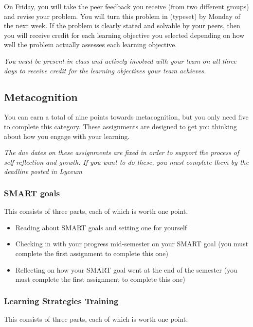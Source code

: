 \documentclass[
  letterpaper,
  DIV=11,
  numbers=noendperiod]{scrartcl}
\providecommand{\tightlist}{%
  \setlength{\itemsep}{0pt}\setlength{\parskip}{0pt}}
\begin{document}
On Friday, you will take the peer feedback you receive (from two
different groups) and revise your problem. You will turn this problem in
(typeset) by Monday of the next week. If the problem is clearly stated
and solvable by your peers, then you will receive credit for each
learning objective you selected depending on how well the problem
actually assesses each learning objective.

\emph{You must be present in class and actively involved with your team
on all three days to receive credit for the learning objectives your
team achieves.}

\subsection{Metacognition}\label{metacognitiongrade}

You can earn a total of nine points towards metacognition, but you only
need five to complete this category. These assignments are designed to
get you thinking about how you engage with your learning.

\emph{The due dates on these assignments are fixed in order to support
the process of self-reflection and growth. If you want to do these, you
must complete them by the deadline posted in Lyceum}

\subsubsection{SMART goals}

This consists of three parts, each of which is worth one point.

\begin{itemize}
\tightlist
\item
  Reading about SMART goals and setting one for yourself
\item
  Checking in with your progress mid-semester on your SMART goal (you
  must complete the first assignment to complete this one)
\item
  Reflecting on how your SMART goal went at the end of the semester (you
  must complete the first assignment to complete this one)
\end{itemize}

\subsubsection{Learning Strategies Training}

This consists of three parts, each of which is worth one point.
\end{document}
